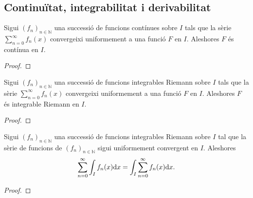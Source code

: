 \documentclass[../Apunts.tex]{subfiles}
\begin{document}
	\subsection{Continuïtat, integrabilitat i derivabilitat}
	\begin{theorem}
		\label{thm:si la sèrie de d'una successió de funcions contínues convergeix uniformement, el seu límit és una funció contínua}
		Sigui \((f_{n})_{n\in\mathbb{N}}\) una successió de funcions contínues sobre \(I\) tals que la sèrie \(\sum_{n=0}^{\infty}f_{n}(x)\) convergeixi uniformement a una funció \(F\) en \(I\). Aleshores \(F\) és contínua en \(I\).
		\begin{proof}
		\end{proof}
	\end{theorem}
	\begin{theorem}
		\label{thm:si la sèrie de d'una successió de funcions integrables Riemann convergeix uniformement, el seu límit és una funció integrable Riemann}
		Sigui \((f_{n})_{n\in\mathbb{N}}\) una successió de funcions integrables Riemann sobre \(I\) tals que la sèrie \(\sum_{n=0}^{\infty}f_{n}(x)\) convergeixi uniformement a una funció \(F\) en \(I\). Aleshores \(F\) és integrable Riemann en \(I\).
		\begin{proof}
		\end{proof}
	\end{theorem}
	\begin{theorem}
		\label{thm:si la sèrie d'una successió de funcions convergeix uniformement aleshores el límit de la integral dels elements de la sèrie de la succesió és la integral del límit del la sèrie de la successió}
		Sigui \((f_{n})_{n\in\mathbb{N}}\) una successió de funcions integrables Riemann sobre \(I\) tal que la sèrie de funcions de \((f_{n})_{n\in\mathbb{N}}\) sigui uniformement convergent en \(I\). Aleshores
		\[\sum_{n=0}^{\infty}\int_{I}f_{n}(x)\textrm{d} x=\int_{I}\sum_{n=0}^{\infty}f_{n}(x)\textrm{d} x.\]
		\begin{proof}
		\end{proof}
	\end{theorem}
	\begin{theorem}
		\label{thm:FER}
				
	\end{theorem}

\end{document}
